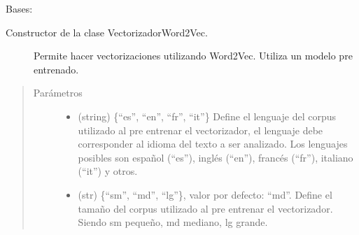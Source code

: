\documentclass[letterpaper,10pt,openany,spanish]{sphinxmanual}
\begin{document}

\begin{fulllineitems}
\label{\detokenize{funciones/vectorizacion:vectorizacion.VectorizadorWord2Vec}}
Bases: 
\begin{description}
\item[{Constructor de la clase VectorizadorWord2Vec. }] \leavevmode
Permite hacer vectorizaciones utilizando Word2Vec. 
Utiliza un modelo pre entrenado.

\end{description}
\begin{quote}\begin{description}
\item[{Parámetros}] \leavevmode\begin{itemize}
\item {} 
 \textendash{} (string) \{“es”, “en”, “fr”, “it”\} Define el 
lenguaje del corpus utilizado al pre entrenar el vectorizador, 
el lenguaje debe corresponder al idioma del texto a ser analizado. 
Los lenguajes posibles son español (“es”), inglés (“en”),  
francés (“fr”), italiano (“it”) y otros.

\item {} 
 \textendash{} (str) \{“sm”, “md”, “lg”\}, valor por defecto: “md”. 
Define el tamaño del corpus utilizado al pre entrenar 
el vectorizador. Siendo sm \sphinxhyphen{} pequeño, md \sphinxhyphen{} mediano, lg \sphinxhyphen{} grande.

\end{itemize}

\end{description}\end{quote}


\end{fulllineitems}
\end{document}
